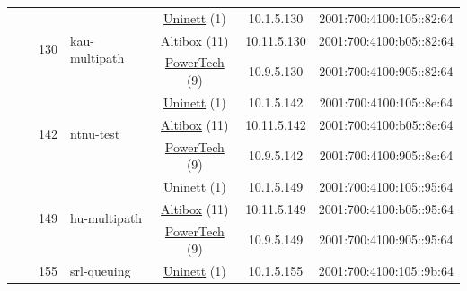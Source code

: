 \begin{small}
\begin{center}
\begin{longtable}{|c|c|c|c|c|c|c|c|}
  &  & \multirow{3}{*}{\tiny{130}} & \multicolumn{1}{|l|}{\multirow{3}{*}{\tiny{kau-multipath}}} & \multicolumn{2}{|c|}{\tiny{\href{https://www.uninett.no}{Uninett} (1)}} & \tiny{10.1.5.130} & \tiny{2001:700:4100:105::82:64} \\* \cline{5-5}\cline{6-6}\cline{7-7}\cline{8-8}
  &  &  &  & \multicolumn{2}{|c|}{\tiny{\href{https://www.altibox.no}{Altibox} (11)}} & \tiny{10.11.5.130} & \tiny{2001:700:4100:b05::82:64} \\* \cline{5-5}\cline{6-6}\cline{7-7}\cline{8-8}
  &  &  &  & \multicolumn{2}{|c|}{\tiny{\href{http://www.powertech.no}{PowerTech} (9)}} & \tiny{10.9.5.130} & \tiny{2001:700:4100:905::82:64} \\* \cline{3-3}\cline{4-4}\cline{5-5}\cline{6-6}\cline{7-7}\cline{8-8}
  &  & \multirow{3}{*}{\tiny{142}} & \multicolumn{1}{|l|}{\multirow{3}{*}{\tiny{ntnu-test}}} & \multicolumn{2}{|c|}{\tiny{\href{https://www.uninett.no}{Uninett} (1)}} & \tiny{10.1.5.142} & \tiny{2001:700:4100:105::8e:64} \\* \cline{5-5}\cline{6-6}\cline{7-7}\cline{8-8}
  &  &  &  & \multicolumn{2}{|c|}{\tiny{\href{https://www.altibox.no}{Altibox} (11)}} & \tiny{10.11.5.142} & \tiny{2001:700:4100:b05::8e:64} \\* \cline{5-5}\cline{6-6}\cline{7-7}\cline{8-8}
  &  &  &  & \multicolumn{2}{|c|}{\tiny{\href{http://www.powertech.no}{PowerTech} (9)}} & \tiny{10.9.5.142} & \tiny{2001:700:4100:905::8e:64} \\* \cline{3-3}\cline{4-4}\cline{5-5}\cline{6-6}\cline{7-7}\cline{8-8}
  &  & \multirow{3}{*}{\tiny{149}} & \multicolumn{1}{|l|}{\multirow{3}{*}{\tiny{hu-multipath}}} & \multicolumn{2}{|c|}{\tiny{\href{https://www.uninett.no}{Uninett} (1)}} & \tiny{10.1.5.149} & \tiny{2001:700:4100:105::95:64} \\* \cline{5-5}\cline{6-6}\cline{7-7}\cline{8-8}
  &  &  &  & \multicolumn{2}{|c|}{\tiny{\href{https://www.altibox.no}{Altibox} (11)}} & \tiny{10.11.5.149} & \tiny{2001:700:4100:b05::95:64} \\* \cline{5-5}\cline{6-6}\cline{7-7}\cline{8-8}
  &  &  &  & \multicolumn{2}{|c|}{\tiny{\href{http://www.powertech.no}{PowerTech} (9)}} & \tiny{10.9.5.149} & \tiny{2001:700:4100:905::95:64} \\* \cline{3-3}\cline{4-4}\cline{5-5}\cline{6-6}\cline{7-7}\cline{8-8}
  &  & \multirow{3}{*}{\tiny{155}} & \multicolumn{1}{|l|}{\multirow{3}{*}{\tiny{srl-queuing}}} & \multicolumn{2}{|c|}{\tiny{\href{https://www.uninett.no}{Uninett} (1)}} & \tiny{10.1.5.155} & \tiny{2001:700:4100:105::9b:64} \\* \cline{5-5}\cline{6-6}\cline{7-7}\cline{8-8}

\end{longtable}
\end{center}
\end{small}
